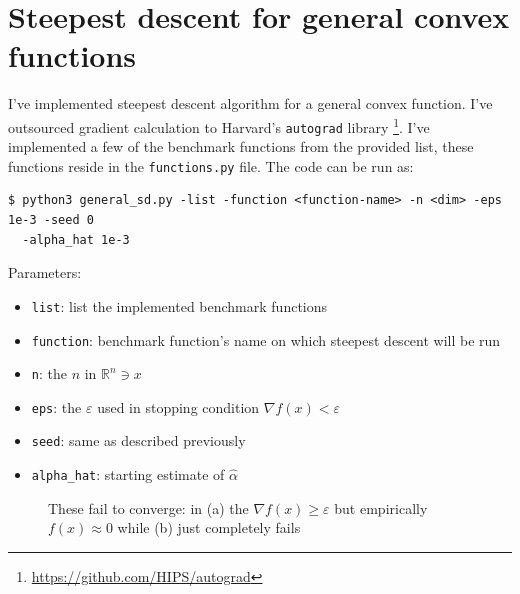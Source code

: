 \documentclass[11pt]{article}
\begin{document}
\section{Steepest descent for general convex functions}
I've implemented steepest descent algorithm for a general convex function. I've
outsourced gradient calculation to Harvard's \verb|autograd| library%
\footnote[1]{\url{https://github.com/HIPS/autograd}}. I've implemented
a few of the benchmark functions from the provided list, these functions reside
in the \verb|functions.py| file. The code can be run as:
\begin{verbatim}
$ python3 general_sd.py -list -function <function-name> -n <dim> -eps 1e-3 -seed 0
  -alpha_hat 1e-3
\end{verbatim}
Parameters:
\begin{itemize}
    \item \verb|list|: list the implemented benchmark functions
    \item \verb|function|: benchmark function's name on which steepest descent will be run
    \item \verb|n|: the $n$ in $\mathbb{R}^n\ni x$
    \item \verb|eps|: the $\varepsilon$ used in stopping condition $\nabla f(x)<\varepsilon$
    \item \verb|seed|: same as described previously
    \item \verb|alpha_hat|: starting estimate of $\hat{\alpha}$
\end{itemize}
\begin{figure}
    \caption{These fail to converge: in (a) the $\nabla f(x)\ge \varepsilon$ but empirically 
    $f(x)\approx 0$ while (b) just completely fails}
\end{figure}
\end{document}

